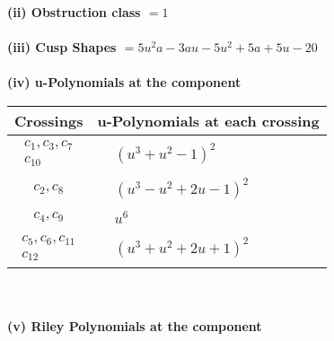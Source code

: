 \documentclass[1p]{elsarticle_modified}
\theoremstyle{definition}
\begin{document}
\flushleft \textbf{(ii) Obstruction class $= 1$}\\~\\
\flushleft \textbf{(iii) Cusp Shapes $= 5 u^2 a-3 a u-5 u^2+5 a+5 u-20$}\\~\\
\newpage\renewcommand{\arraystretch}{1}
\flushleft \textbf{(iv) u-Polynomials at the component}\newline \\
\begin{tabular}{m{50pt}|m{274pt}}
Crossings & \hspace{64pt}u-Polynomials at each crossing \\
\hline $$\begin{aligned}c_{1},c_{3},c_{7}\\c_{10}\end{aligned}$$&$\begin{aligned}
&(u^3+u^2-1)^2
\end{aligned}$\\
\hline $$\begin{aligned}c_{2},c_{8}\end{aligned}$$&$\begin{aligned}
&(u^3- u^2+2 u-1)^2
\end{aligned}$\\
\hline $$\begin{aligned}c_{4},c_{9}\end{aligned}$$&$\begin{aligned}
&u^6
\end{aligned}$\\
\hline $$\begin{aligned}c_{5},c_{6},c_{11}\\c_{12}\end{aligned}$$&$\begin{aligned}
&(u^3+u^2+2 u+1)^2
\end{aligned}$\\
\hline
\end{tabular}\\~\\
\newpage\renewcommand{\arraystretch}{1}
\flushleft \textbf{(v) Riley Polynomials at the component}\newline \\
\end{document}
